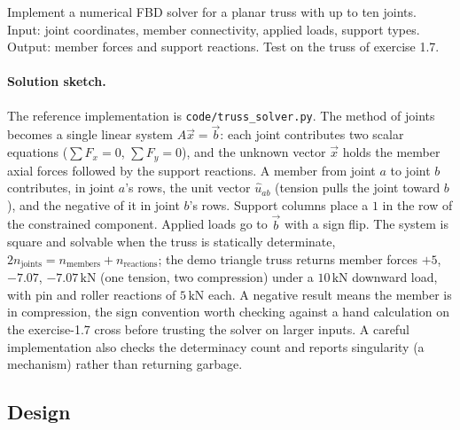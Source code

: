 \begin{exercise}
Implement a numerical FBD solver for a planar truss with up to ten
joints. Input: joint coordinates, member connectivity, applied loads,
support types. Output: member forces and support reactions. Test on
the truss of exercise 1.7.
\paragraph{Solution sketch.} The reference implementation is
\texttt{code/truss\_solver.py}. The method of joints becomes a single
linear system $A\vec{x} = \vec{b}$: each joint contributes two scalar
equations ($\sum F_x = 0$, $\sum F_y = 0$), and the unknown vector
$\vec{x}$ holds the member axial forces followed by the support
reactions. A member from joint $a$ to joint $b$ contributes, in joint
$a$'s rows, the unit vector $\hat{u}_{ab}$ (tension pulls the joint
toward $b$), and the negative of it in joint $b$'s rows. Support columns
place a $1$ in the row of the constrained component. Applied loads go to
$\vec{b}$ with a sign flip. The system is square and solvable when the
truss is statically determinate, $2n_{\text{joints}} = n_{\text{members}}
+ n_{\text{reactions}}$; the demo triangle truss returns member forces
$+5$, $-7.07$, $-7.07\,\text{kN}$ (one tension, two compression) under a
$10\,\text{kN}$ downward load, with pin and roller reactions of $5\,
\text{kN}$ each. A negative result means the member is in compression,
the sign convention worth checking against a hand calculation on the
exercise-1.7 cross before trusting the solver on larger inputs. A
careful implementation also checks the determinacy count and reports
singularity (a mechanism) rather than returning garbage.
\end{exercise}

\subsection*{Design}

